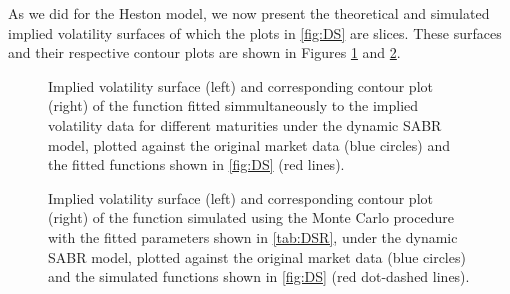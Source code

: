 As we did for the Heston model, we now present the theoretical and simulated implied volatility surfaces of which the plots in \autoref{fig:DS} are slices. 
These surfaces and their respective contour plots are shown in Figures \ref{fig:DSS} and \ref{fig:DSSSim}.



\begin{figure}[H]
  \begin{subfigmatrix}{2}
  \end{subfigmatrix}
    \caption[Implied volatility surface and corresponding contour plot of the function fitted simmultaneously to the implied volatility data for different maturities under the dynamic SABR model, plotted against the original market data and the fitted functions shown in \autoref{fig:DS}.]{Implied volatility surface (left) and corresponding contour plot (right) of the function fitted simmultaneously to the implied volatility data for different maturities under the dynamic SABR model, plotted against the original market data (blue circles) and the fitted functions shown in \autoref{fig:DS} (red lines).}\label{fig:DSS}
\end{figure}   


\begin{figure}[H]
  \begin{subfigmatrix}{2}
  \end{subfigmatrix}
    \caption[Implied volatility surface and corresponding contour plot of the function simulated using the Monte Carlo procedure with the fitted parameters shown in \autoref{tab:DSR}, under the dynamic SABR model, plotted against the original market data and the simulated functions shown in \autoref{fig:DS}.]{Implied volatility surface (left) and corresponding contour plot (right) of the function simulated using the Monte Carlo procedure with the fitted parameters shown in \autoref{tab:DSR}, under the dynamic SABR model, plotted against the original market data (blue circles) and the simulated functions shown in \autoref{fig:DS} (red dot-dashed lines).}\label{fig:DSSSim}
\end{figure} 


